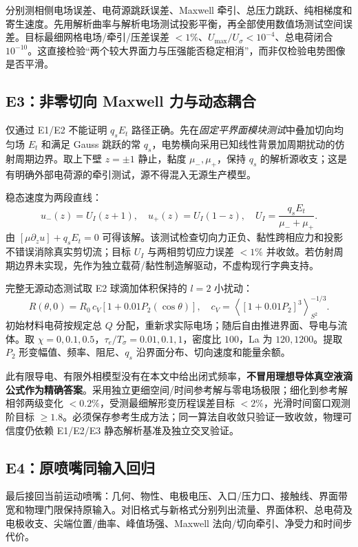 \documentclass[UTF8,a4paper,11pt,fontset=fandol]{ctexart}
\numberwithin{equation}{section}
\begin{document}
分别测相侧电场误差、电荷源跳跃误差、Maxwell 牵引、总压力跳跃、纯相梯度和寄生速度。先用解析曲率与解析电场测试投影平衡，再全部使用数值场测试空间误差。目标最细网格电场/牵引/压差误差 $<1\%$、$U_{\max}/U_\sigma<10^{-4}$、总电荷闭合 $10^{-10}$。这直接检验“两个较大界面力与压强能否稳定相消”，而非仅检验电势图像是否平滑。

\subsection{E3：非零切向 Maxwell 力与动态耦合}
仅通过 E1/E2 不能证明 $q_sE_t$ 路径正确。先在\emph{固定平界面模块测试}中叠加切向均匀场 $E_t$ 和满足 Gauss 跳跃的常 $q_s$，电势横向采用已知线性背景加周期扰动的仿射周期边界。取上下壁 $z=\pm1$ 静止，黏度 $\mu_-,\mu_+$，保持 $q_s$ 的解析源收支；这是有明确外部电荷源的牵引测试，源不得混入无源生产模型。

稳态速度为两段直线：
\begin{equation}
 u_-(z)=U_I(z+1),\quad u_+(z)=U_I(1-z),\quad
 U_I=\frac{q_sE_t}{\mu_-+\mu_+}.
\end{equation}
由 $[\mu\partial_zu]+q_sE_t=0$ 可得该解。该测试检查切向力正负、黏性跨相应力和投影不错误消除真实剪切流；目标 $U_I$ 与两相剪切应力误差 $<1\%$ 并收敛。若仿射周期边界未实现，先作为独立载荷/黏性制造解驱动，不虚构现行字典支持。

完整无源动态测试取 E2 球滴加体积保持的 $l=2$ 小扰动：
\begin{equation}
 R(\theta,0)=R_0\,c_V[1+0.01P_2(\cos\theta)],\quad
 c_V=\left\langle[1+0.01P_2]^3\right\rangle_{S^2}^{-1/3}.
\end{equation}
初始材料电荷按规定总 $Q$ 分配，重新求实际电场；随后自由推进界面、导电与流体。取 $\chi=0,0.1,0.5$，$\tau_e/T_\sigma=0.01,0.1,1$，密度比 $100$，La 为 $120,1200$。提取 $P_2$ 形变幅值、频率、阻尼、$q_s$ 沿界面分布、切向速度和能量余额。

此有限导电、有限外相模型没有在本文中给出闭式频率，\textbf{不冒用理想导体真空液滴公式作为精确答案}。采用独立更细空间/时间参考解与零电场极限；细化到参考解相邻两级变化 $<0.2\%$，受测最细解形变历程误差目标 $<2\%$，光滑时间窗口观测阶目标 $\ge1.8$。必须保存参考生成方法；同一算法自收敛只验证一致收敛，物理可信度仍依赖 E1/E2/E3 静态解析基准及独立交叉验证。

\subsection{E4：原喷嘴同输入回归}
最后接回当前运动喷嘴：几何、物性、电极电压、入口/压力口、接触线、界面带宽和物理门限保持原输入。对旧格式与新格式分别列出流量、界面体积、总电荷及电极收支、尖端位置/曲率、峰值场强、Maxwell 法向/切向牵引、净受力和时间步代价。
\end{document}
